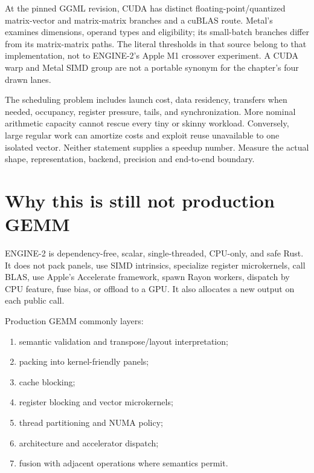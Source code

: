 At the pinned GGML revision, CUDA has distinct floating-point/quantized
matrix-vector and matrix-matrix branches and a cuBLAS route. Metal's
\texttt{} examines dimensions,
operand types and eligibility; its small-batch branches differ from its
matrix-matrix paths. The literal thresholds in that source belong to
that implementation, not to ENGINE-2's Apple M1 crossover experiment. A
CUDA warp and Metal SIMD group are not a portable synonym for the
chapter's four drawn lanes.

The scheduling problem includes launch cost, data residency, transfers
when needed, occupancy, register pressure, tails, and synchronization.
More nominal arithmetic capacity cannot rescue every tiny or skinny
workload. Conversely, large regular work can amortize costs and exploit
reuse unavailable to one isolated vector. Neither statement supplies a
speedup number. Measure the actual shape, representation, backend,
precision and end-to-end boundary.

\section{Why this is still not production
GEMM}\label{why-this-is-still-not-production-gemm}

ENGINE-2 is dependency-free, scalar, single-threaded, CPU-only, and safe
Rust. It does not pack panels, use SIMD intrinsics, specialize register
microkernels, call BLAS, use Apple's Accelerate framework, spawn Rayon
workers, dispatch by CPU feature, fuse bias, or offload to a GPU. It
also allocates a new output on each public call.

Production GEMM commonly layers:

\begin{enumerate}
\def\labelenumi{\arabic{enumi}.}
\tightlist
\item
  semantic validation and transpose/layout interpretation;
\item
  packing into kernel-friendly panels;
\item
  cache blocking;
\item
  register blocking and vector microkernels;
\item
  thread partitioning and NUMA policy;
\item
  architecture and accelerator dispatch;
\item
  fusion with adjacent operations where semantics permit.
\end{enumerate}

